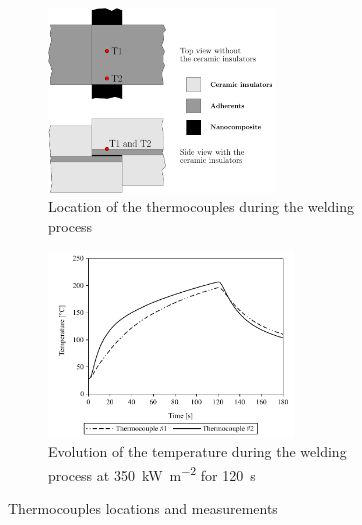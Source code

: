 \documentclass[11pt,review,times]{elsarticle}
\begin{document}
\begin{figure}[htb]
	\centering
	\captionsetup{width=130mm}
	\begin{subfigure}{65mm}
		\centering
		\captionsetup{width=65mm}
		\includegraphics[width=60mm]{Fig2a.pdf}
		\caption{Location of the thermocouples during the welding process \cite{Brassard2018_figshare_article1}}
		\label{fig:location_thermocouple}
	\end{subfigure}
	\begin{subfigure}{65mm}
		\centering
		\captionsetup{width=65mm}
		\includegraphics[width=65mm]{Fig2b.pdf}
		\caption{Evolution of the temperature during the welding process at \SI{350}{\kilo\watt\per\square\metre} for \SI{120}{\second} \cite{Brassard2018_figshare_article1}}
		\label{fig:temp_350kW_120_10_150_3UD}
	\end{subfigure}%
	\caption{Thermocouples locations and measurements}
	\label{fig:thermocouple_results}
\end{figure}
\end{document}
